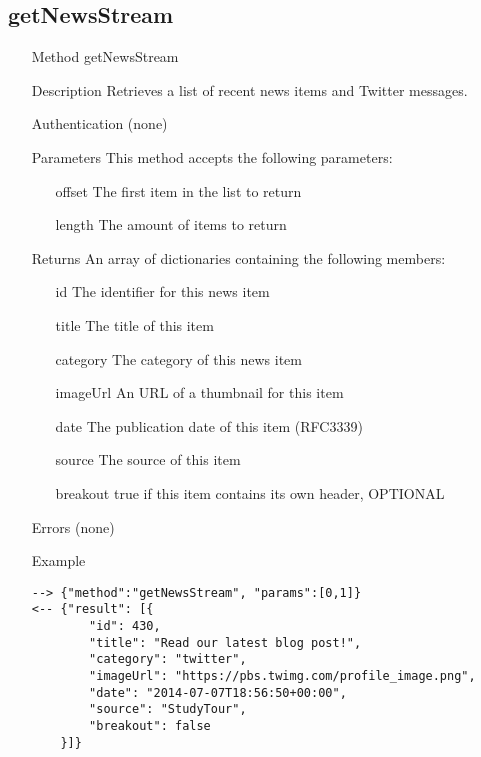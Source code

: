 \documentclass[a4paper]{scrreprt}
\begin{document}
\subsection{getNewsStream}
\begin{enumerate}
\item[Method] getNewsStream
\item[Description] Retrieves a list of recent news items and Twitter messages.
\item[Authentication] (none)
\item[Parameters] This method accepts the following parameters:
\begin{enumerate}
	\item[offset] The first item in the list to return
	\item[length] The amount of items to return
    \end{enumerate}
\item[Returns] An array of dictionaries containing the following members:
\begin{enumerate}
    \item[id] The identifier for this news item
    \item[title] The title of this item
	\item[category] The category of this news item
    \item[imageUrl] An URL of a thumbnail for this item
    \item[date] The publication date of this item (RFC3339)
    \item[source] The source of this item
    \item[breakout] true if this item contains its own header, OPTIONAL
    \end{enumerate}
\item[Errors] (none)
\item[Example]
\begin{lstlisting}
--> {"method":"getNewsStream", "params":[0,1]}
<-- {"result": [{
        "id": 430,
        "title": "Read our latest blog post!",
        "category": "twitter",
        "imageUrl": "https://pbs.twimg.com/profile_image.png",
        "date": "2014-07-07T18:56:50+00:00",
        "source": "StudyTour",
        "breakout": false
    }]}
\end{lstlisting}
\end{enumerate}

\clearpage
\end{document}
